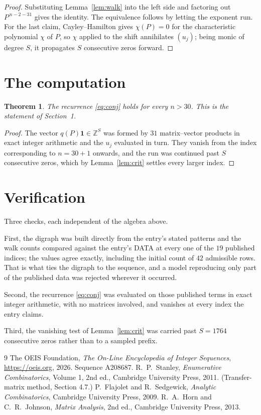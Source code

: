 \documentclass[11pt,a4paper]{article}
\theoremstyle{plain}
\newtheorem{theorem}{Theorem}
\theoremstyle{definition}
\begin{document}
\begin{proof}
Substituting Lemma~\ref{lem:walk} into the left side and factoring out
$P^{\,n-2-31}$ gives the identity. The equivalence follows by letting the exponent
run. For the last claim, Cayley--Hamilton gives $\chi(P)=0$ for the characteristic
polynomial $\chi$ of $P$, so $\chi$ applied to the shift annihilates $(u_j)$; being monic of
degree $S$, it propagates $S$ consecutive zeros forward.
\end{proof}

\section{The computation}

\begin{theorem}
The recurrence \eqref{eq:conj} holds for every $n>30$. This is the statement of
Section~1.
\end{theorem}

\begin{proof}
The vector $q(P)\mathbf{1}\in\mathbb{Z}^{S}$ was formed by $31$ matrix--vector
products in exact integer arithmetic and the $u_j$ evaluated in turn. They vanish from the
index corresponding to $n=30+1$ onwards, and the run was continued past $S$ consecutive
zeros, which by Lemma~\ref{lem:crit} settles every larger index.
\end{proof}

\section{Verification}

Three checks, each independent of the algebra above.

First, the digraph was built directly from the entry's stated patterns and the walk counts
compared against the entry's DATA at every one of the $19$ published indices; the
values agree exactly, including the initial count of $42$ admissible rows. That is
what ties the digraph to the sequence, and a model reproducing only part of the published
data was rejected wherever it occurred.

Second, the recurrence \eqref{eq:conj} was evaluated on those published terms in exact
integer arithmetic, with no matrices involved, and vanishes at every index the entry claims.

Third, the vanishing test of Lemma~\ref{lem:crit} was carried past $S=1764$ consecutive
zeros rather than to a sampled prefix.

\begin{thebibliography}{9}
 The OEIS Foundation, \emph{The On-Line Encyclopedia of Integer
Sequences}, \url{https://oeis.org}, 2026. Sequence A208687.
 R.~P.~Stanley, \emph{Enumerative Combinatorics}, Volume 1, 2nd ed.,
Cambridge University Press, 2011. (Transfer-matrix method, Section 4.7.)
 P.~Flajolet and R.~Sedgewick, \emph{Analytic Combinatorics}, Cambridge
University Press, 2009.
 R.~A.~Horn and C.~R.~Johnson, \emph{Matrix Analysis}, 2nd ed., Cambridge
University Press, 2013.
\end{thebibliography}
\end{document}
